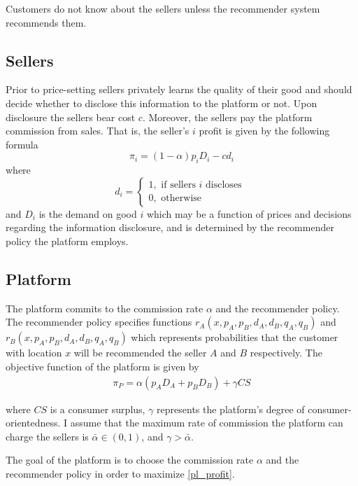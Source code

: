 \documentclass[a4paper]{article}
\begin{document}
	
	
	Customers do not know about the sellers unless the recommender system recommends them.
	
	
	\subsection{Sellers}
	
	
	Prior to price-setting sellers privately learns the quality of their good and should decide whether to disclose this information to the platform or not. Upon disclosure the sellers bear cost $c$. Moreover, the sellers pay the platform commission from sales. That is, the seller's $i$ profit is given by the following formula
	$$\pi_i = (1-\alpha)p_i D_i - c d_i$$
	where $$d_i = \begin{cases}
	1, \text{ if sellers }i\text{ discloses }\\
	0, \text{ otherwise }
	\end{cases}$$ and $D_i$ is the demand on good $i$ which may be a function of prices and decisions regarding the information disclosure, and is determined by the recommender policy the platform employs.
	
	
	
	\subsection{Platform}
	
	The platform commits to the commission rate $\alpha$ and the recommender policy. The recommender policy specifies functions $r_A(x, p_A, p_B, d_A, d_B, q_A, q_B)$ and $r_B(x, p_A, p_B, d_A, d_B, q_A, q_B)$ which represents probabilities that the customer with location $x$ will be recommended the seller $A$ and $B$ respectively. The objective function of the platform is given by \begin{align}\label{pl_profit}
	\pi_P = \alpha(p_A D_A + p_B D_B) + \gamma CS
	\end{align}
	
	where $CS$ is a consumer surplus, $\gamma$ represents the platform's degree of consumer-orientedness. I assume that the maximum rate of commission the platform can charge the sellers is $\bar{\alpha} \in (0, 1)$, and $\gamma > \bar{\alpha}$.
	
	
	The goal of the platform is to choose the commission rate $\alpha$ and the recommender policy in order to maximize \eqref{pl_profit}.
	
\end{document}

